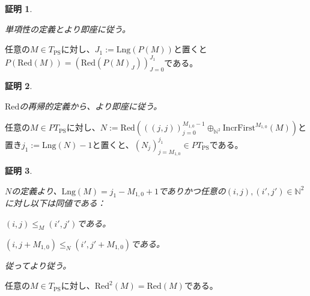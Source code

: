 \documentclass[dvipdfmx,uplatex]{jsarticle}
\theoremstyle{customnonumberbreakfortheorem}
\theoremstyle{customnonumberbreakforproof}
\newtheorem{hideableproof}{証明}
\begin{document}
\begin{hideableproof}
	\begin{indented}
		\item 単項性の定義とより即座に従う。
	\end{indented}
\end{hideableproof}

\begin{corollary}\label{PのRed同変性}
	任意の\(M \in T_{\textrm{PS}}\)に対し、\(J_1 := \textrm{Lng}(P(M))\)と置くと\(P(\textrm{Red}(M)) = (\textrm{Red}(P(M)_J))_{J=0}^{J_1}\)である。
\end{corollary}

\begin{hideableproof}
	\begin{indented}
		\item \(\textrm{Red}\)の再帰的定義から、より即座に従う。
	\end{indented}
\end{hideableproof}

\begin{proposition}\label{単項性とRedの関係}
	任意の\(M \in PT_{\textrm{PS}}\)に対し、\(N := \textrm{Red}(((j,j))_{j=0}^{M_{1,0}-1} \oplus_{\mathbb{N}^2} \textrm{IncrFirst}^{M_{1,0}}(M))\)と置き\(j_1 := \textrm{Lng}(N)-1\)と置くと、\((N_j)_{j=M_{1,0}}^{j_1} \in PT_{\textrm{PS}}\)である。
\end{proposition}

\begin{hideableproof}
	\begin{indented}
		\item \(N\)の定義より、\(\textrm{Lng}(M) = j_1 - M_{1,0} + 1\)でありかつ任意の\((i,j), (i',j') \in \mathbb{N}^2\)に対し以下は同値である：
		\begin{penumerate}
			\item \((i,j) \leq_M (i',j')\)である。
			\item \((i,j+M_{1,0}) \leq_N (i',j'+M_{1,0})\)である。
		\end{penumerate}
		\item 従ってより従う。
	\end{indented}
\end{hideableproof}

\begin{proposition}\label{Redの冪等性}
	任意の\(M \in T_{\textrm{PS}}\)に対し、\(\textrm{Red}^2(M) = \textrm{Red}(M)\)である。
\end{proposition}
\end{document}
